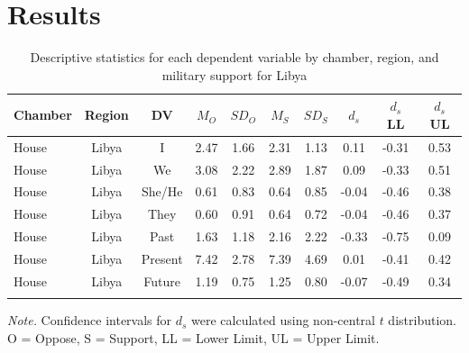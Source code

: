 \documentclass[english,man]{apa6}
\theoremstyle{definition}
\theoremstyle{definition}
\theoremstyle{definition}
\theoremstyle{remark}
\begin{document}
\section{Results}\label{results-4}

\begin{table}[tbp]
\begin{center}
\begin{threeparttable}
\caption{\label{tab:Ltable}Descriptive statistics for each dependent variable by chamber, 
          region, and military support for Libya}
\small{
\begin{tabular}{lccccccccc}
\toprule
Chamber & Region & DV & $M_O$ & $SD_O$ & $M_S$ & $SD_S$ & $d_s$ & $d_s$ LL & $d_s$ UL\\
\midrule
House & Libya & I & 2.47 & 1.66 & 2.31 & 1.13 & 0.11 & -0.31 & 0.53\\
House & Libya & We & 3.08 & 2.22 & 2.89 & 1.87 & 0.09 & -0.33 & 0.51\\
House & Libya & She/He & 0.61 & 0.83 & 0.64 & 0.85 & -0.04 & -0.46 & 0.38\\
House & Libya & They & 0.60 & 0.91 & 0.64 & 0.72 & -0.04 & -0.46 & 0.37\\
House & Libya & Past & 1.63 & 1.18 & 2.16 & 2.22 & -0.33 & -0.75 & 0.09\\
House & Libya & Present & 7.42 & 2.78 & 7.39 & 4.69 & 0.01 & -0.41 & 0.42\\
House & Libya & Future & 1.19 & 0.75 & 1.25 & 0.80 & -0.07 & -0.49 & 0.34\\
\bottomrule
\addlinespace
\end{tabular}
}
\begin{tablenotes}[para]
\textit{Note.} Confidence intervals for $d_s$ were calculated using 
          non-central $t$ distribution. O = Oppose, S = Support, LL = Lower Limit, UL = Upper Limit.
\end{tablenotes}
\end{threeparttable}
\end{center}
\end{table}
\end{document}
